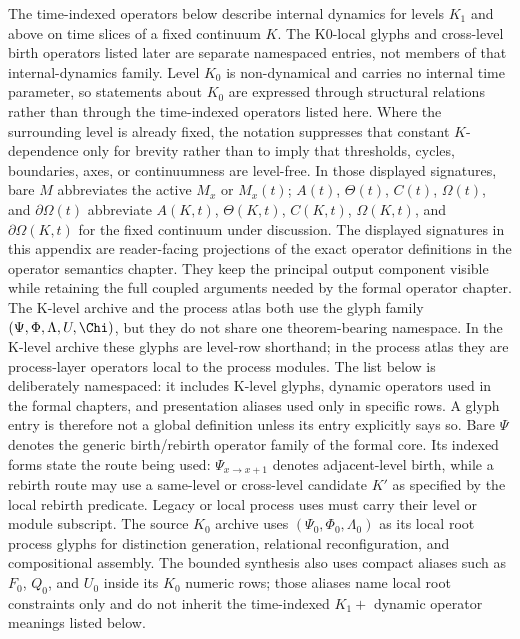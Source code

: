 The time-indexed operators below describe internal dynamics for levels \(K_1\)
and above on time slices of a fixed continuum \(K\). The K0-local glyphs and
cross-level birth operators listed later are separate namespaced entries, not
members of that internal-dynamics family. Level \(K_0\) is non-dynamical and
carries no internal time parameter, so statements about \(K_0\) are expressed
through structural relations rather than through the time-indexed operators
listed here. Where the surrounding level is already fixed, the notation
suppresses that constant \(K\)-dependence only for brevity rather than to imply
that thresholds, cycles, boundaries, axes, or continuumness are level-free.
In those displayed signatures, bare \(M\) abbreviates the active \(M_x\) or
\(M_x(t)\); \(A(t)\), \(\Theta(t)\), \(C(t)\), \(\Omega(t)\), and
\(\partial\Omega(t)\) abbreviate \(A(K,t)\), \(\Theta(K,t)\), \(C(K,t)\),
\(\Omega(K,t)\), and \(\partial\Omega(K,t)\) for the fixed continuum under
discussion.
The displayed signatures in this appendix are reader-facing projections of
the exact operator definitions in the operator semantics chapter. They keep
the principal output component visible while retaining the full coupled
arguments needed by the formal operator chapter.
The K-level archive and the process atlas both use the glyph family
\((\Psi,\Phi,\Lambda,U,\Chi)\), but they do not share one theorem-bearing
namespace. In the K-level archive these glyphs are level-row shorthand; in the
process atlas they are process-layer operators local to the process modules.
The list below is deliberately namespaced: it includes K-level glyphs, dynamic
operators used in the formal chapters, and presentation aliases used only in
specific rows. A glyph entry is therefore not a global definition unless its
entry explicitly says so.
Bare \(\Psi\) denotes the generic birth/rebirth operator family of the formal
core. Its indexed forms state the route being used: \(\Psi_{x\to x+1}\)
denotes adjacent-level birth, while a rebirth route may use a same-level or
cross-level candidate \(K'\) as specified by the local rebirth predicate.
Legacy or local process uses must carry their level or module subscript.
The source \(K_0\) archive uses \((\Psi_0,\Phi_0,\Lambda_0)\) as its local
root process glyphs for distinction generation, relational reconfiguration,
and compositional assembly. The bounded synthesis also uses compact aliases such
as \(F_0\), \(Q_0\), and \(U_0\) inside its \(K_0\) numeric rows; those aliases
name local root constraints only and do not inherit the time-indexed \(K_1+\)
dynamic operator meanings listed below.


